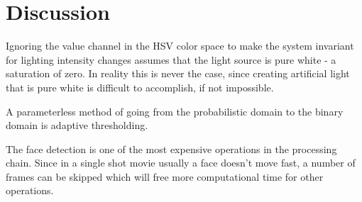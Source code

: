 \section{Discussion}
Ignoring the value channel in the HSV color space to make the system invariant for lighting intensity changes assumes that the light source is pure white - a saturation of zero. In reality this is never the case, since creating artificial light that is pure white is difficult to accomplish, if not impossible.

A parameterless method of going from the probabilistic domain to the binary domain is adaptive thresholding.

The face detection is one of the most expensive operations in the processing chain. Since in a single shot movie usually a face doesn't move fast, a number of frames can be skipped which will free more computational time for other operations.

